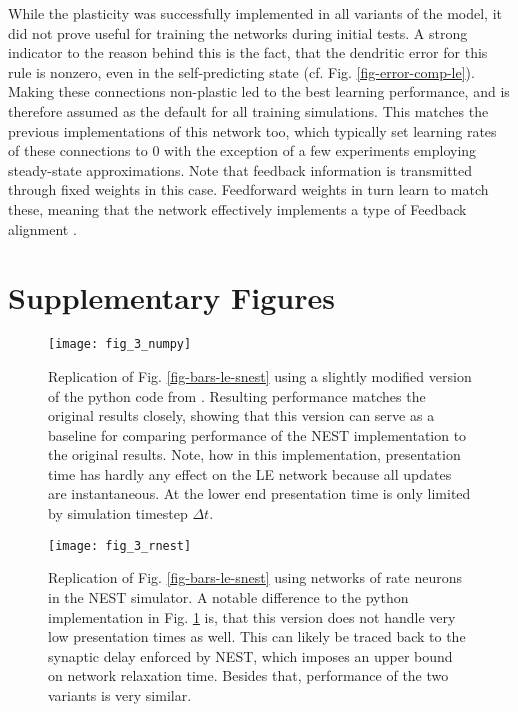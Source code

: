 While the plasticity was successfully implemented in all variants of the model, it did not prove useful for training the
networks during initial tests. A strong indicator to the reason behind this is the fact, that the dendritic error for
this rule is nonzero, even in the self-predicting state (cf. Fig. \ref{fig-error-comp-le}). Making these connections
non-plastic led to the best learning performance, and is therefore assumed as the default for all training simulations.
This matches the previous implementations of this network too, which typically set learning rates of these connections
to $0$ with the exception of a few experiments employing steady-state approximations. Note that feedback information is
transmitted through fixed weights in this case. Feedforward weights in turn learn to match these, meaning that the
network effectively implements a type of Feedback alignment \cite{Lillicrap2014}.

\newpage
\section{Supplementary Figures}


\renewcommand{\thefigure}{S\arabic{figure}}
\begin{figure}[h!]
  \centering
  \texttt{[image: fig\_3\_numpy]}
  \caption{Replication of Fig. \ref{fig-bars-le-snest} using a slightly modified version of the python code from
    \cite{Haider2021}. Resulting performance matches the original results closely, showing that this version can serve
    as a baseline for comparing performance of the NEST implementation to the original results. Note, how in this
    implementation, presentation time has hardly any effect on the LE network because all updates are instantaneous. At
    the lower end presentation time is only limited by simulation timestep $\Delta t$.}
  \label{fig-bars-le-numpy}
\end{figure}


\begin{figure}[h!]
  \centering
  \texttt{[image: fig\_3\_rnest]}
  \caption{Replication of Fig. \ref{fig-bars-le-snest} using networks of rate neurons in the NEST simulator. A notable
    difference to the python implementation in Fig. \ref{fig-bars-le-numpy} is, that this version does not handle very
    low presentation times as well. This can likely be traced back to the synaptic delay enforced by NEST, which imposes
    an upper bound on network relaxation time. Besides that, performance of the two variants is very similar.}
  \label{fig-bars-le-rnest}
\end{figure}



